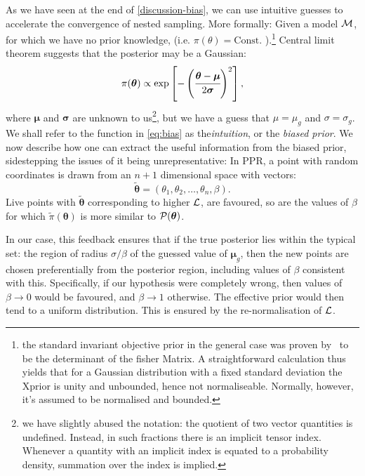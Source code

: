 \documentclass[usenatbib]{mnras}
\begin{document}
As we have seen at the end of \cref{discussion-bias}, we can use
intuitive guesses to accelerate the convergence of nested
sampling. More formally: Given a model \({\cal M}\), for which we have
no prior knowledge, (i.e. \(\pi(\theta) = \text{Const.}\)
).\footnote{the standard invariant objective prior in the general case
  was proven by~\cite{JeffreysPrior} to be the determinant of the
  fisher Matrix. A straightforward calculation thus yields that for a
  Gaussian distribution with a fixed standard deviation the Xprior is
  unity and unbounded, hence not normaliseable. Normally, however,
  it's assumed to be normalised and bounded.} Central limit theorem
suggests that the posterior may be a Gaussian:
\begin{equation}
 \pi (\bm{\theta}) \propto \exp \left[-\left(\cfrac{\bm{\theta} - \bm{\mu}}{2\bm{\sigma}}\right)^{2} \right],
 \label{eq:bias}
\end{equation}
where \(\bm{\mu}\) and \(\bm{\sigma}\) are unknown to us\footnote{we
  have slightly abused the notation: the quotient of two vector
  quantities is undefined. Instead, in such fractions there is an
  implicit tensor index. Whenever a quantity with an implicit index is
  equated to a probability density, summation over the index is
  implied.}, but we have a guess that $\mu=\mu_{g}$ and
$\sigma=\sigma_{g}$. We shall refer to the function in \cref{eq:bias}
as the\emph{intuition}, or the \emph{biased prior}. We now describe
how one can extract the useful information from the biased prior,
sidestepping the issues of it being unrepresentative: In PPR, a point
with random coordinates is drawn from an \(n+1\) dimensional space
with vectors:
\begin{equation}
  \tilde{\bm{\theta}} = (\theta_{1}, \theta_{2}, \ldots, \theta_{n}, \beta). 
\end{equation}
Live points with $\tilde{\bm{\theta}}$ corresponding to higher
${\cal L}$, are favoured, so are the values of $\beta$ for which
$\tilde{\pi}(\bm{\theta})$ is more similar to ${\cal P}(\bm{\theta})$.

In our case, this feedback ensures that if the true posterior lies
within the typical set: the region of radius \(\sigma / \beta\) of the
guessed value of \(\bm{\mu}_{g}\), then the new points are chosen
preferentially from the posterior region, including values of
\(\beta\) consistent with this. Specifically, if our hypothesis were
completely wrong, then values of \(\beta \rightarrow 0\) would be
favoured, and $\beta\rightarrow 1$ otherwise. The effective prior
would then tend to a uniform distribution. This is ensured by the
re-normalisation of \({\cal L}\).
\end{document}
